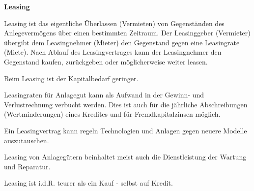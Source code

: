 \textbf{Leasing}

Leasing ist das eigentliche Überlassen (Vermieten) von Gegenständen des Anlegevermögens über einen bestimmten Zeitraum. Der Leasinggeber (Vermieter) übergibt dem Leasingnehmer (Mieter) den Gegenstand gegen eine Leasingrate (Miete). Nach Ablauf des Leasingvertrages kann der Leasingnehmer den Gegenstand kaufen, zurückgeben oder möglicherweise weiter leasen.

Beim Leasing ist der Kapitalbedarf geringer.

Leasingraten für Anlagegut kann als Aufwand in der Gewinn- und Verlustrechnung verbucht werden. Dies ist auch für die jährliche Abschreibungen (Wertminderungen) eines Kredites und für Fremdkapitalzinsen möglich.

Ein Leasingvertrag kann regeln Technologien und Anlagen gegen neuere Modelle auszutauschen.

Leasing von Anlagegütern beinhaltet meist auch die Dienstleistung der Wartung und Reparatur.

Leasing ist i.d.R. teurer als ein Kauf - selbst auf Kredit.